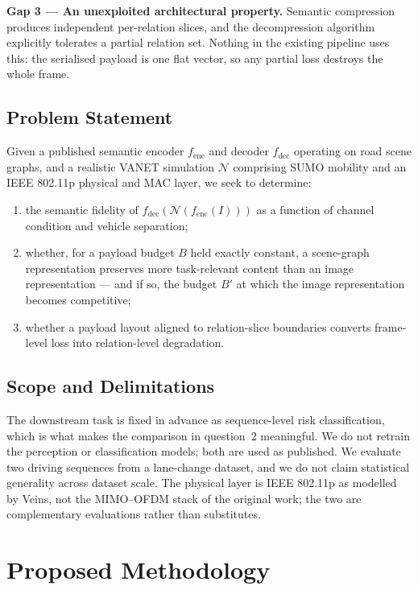 \documentclass{iutbscthesis}
\begin{document}
\textbf{Gap 3 --- An unexploited architectural property.} Semantic compression
produces independent per-relation slices, and the decompression algorithm
explicitly tolerates a partial relation set. Nothing in the existing pipeline
uses this: the serialised payload is one flat vector, so any partial loss
destroys the whole frame.

\section{Problem Statement}

Given a published semantic encoder $f_{\text{enc}}$ and decoder
$f_{\text{dec}}$ operating on road scene graphs, and a realistic VANET
simulation $\mathcal{N}$ comprising SUMO mobility and an IEEE 802.11p physical
and MAC layer, we seek to determine:

\begin{enumerate}
    \item the semantic fidelity of $f_{\text{dec}}(\mathcal{N}(f_{\text{enc}}(I)))$
    as a function of channel condition and vehicle separation;
    \item whether, for a payload budget $B$ held exactly constant, a scene-graph
    representation preserves more task-relevant content than an image
    representation --- and if so, the budget $B'$ at which the image
    representation becomes competitive;
    \item whether a payload layout aligned to relation-slice boundaries
    converts frame-level loss into relation-level degradation.
\end{enumerate}

\section{Scope and Delimitations}

The downstream task is fixed in advance as sequence-level risk classification,
which is what makes the comparison in question~2 meaningful. We do not retrain
the perception or classification models; both are used as published. We
evaluate two driving sequences from a lane-change dataset, and we do not claim
statistical generality across dataset scale. The physical layer is IEEE
802.11p as modelled by Veins, not the MIMO--OFDM stack of the original work;
the two are complementary evaluations rather than substitutes.

\chapter{Proposed Methodology} \label{chapter:proposed}
\end{document}
